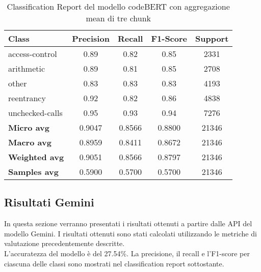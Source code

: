 \documentclass[../../Thesis.tex]{subfiles}
\begin{document}
\begin{table}[H]
    \centering
    \small
    \begin{tabular}{lcccc}
    \hline
    \textbf{Class} & \textbf{Precision} & \textbf{Recall} & \textbf{F1-Score} & \textbf{Support} \\
    \hline
    access-control & 0.89 & 0.82 & 0.85 & 2331 \\
    arithmetic & 0.89 & 0.81 & 0.85 & 2708 \\
    other & 0.83 & 0.83 & 0.83 & 4193 \\
    reentrancy & 0.92 & 0.82 & 0.86 & 4838 \\
    unchecked-calls & 0.95 & 0.93 & 0.94 & 7276 \\
    \hline
    \textbf{Micro avg} & 0.9047 & 0.8566 & 0.8800 & 21346 \\
    \textbf{Macro avg} & 0.8959 & 0.8411 & 0.8672 & 21346 \\
    \textbf{Weighted avg} & 0.9051 & 0.8566 & 0.8797 & 21346 \\
    \textbf{Samples avg} & 0.5900 & 0.5700 & 0.5700 & 21346 \\
    \hline
    \end{tabular}
    \caption{Classification Report del modello codeBERT con aggregazione mean di tre chunk}
    \end{table}
    

\subsection{Risultati Gemini}

In questa sezione verranno presentati i risultati ottenuti a partire dalle API del modello Gemini. I risultati ottenuti sono stati calcolati utilizzando le metriche di valutazione precedentemente descritte.\\
L'accuratezza del modello è del 27.54\%. La precisione, il recall e l'F1-score per ciascuna delle classi sono mostrati nel classification report sottostante.
\end{document}
